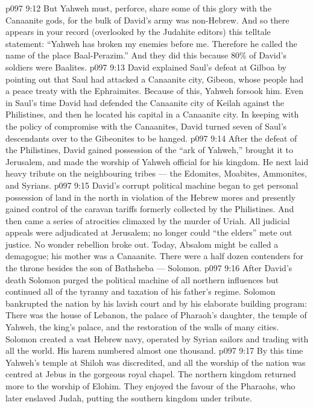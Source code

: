 \vs p097 9:12 But Yahweh must, perforce, share some of this glory with the Canaanite gods, for the bulk of David’s army was non\hyp{}Hebrew. And so there appears in your record (overlooked by the Judahite editors) this telltale statement: “Yahweh has broken my enemies before me. Therefore he called the name of the place Baal\hyp{}Perazim.” And they did this because 80\% of David’s soldiers were Baalites.
\vs p097 9:13 David explained Saul’s defeat at Gilboa by pointing out that Saul had attacked a Canaanite city, Gibeon, whose people had a peace treaty with the Ephraimites. Because of this, Yahweh forsook him. Even in Saul’s time David had defended the Canaanite city of Keilah against the Philistines, and then he located his capital in a Canaanite city. In keeping with the policy of compromise with the Canaanites, David turned seven of Saul’s descendants over to the Gibeonites to be hanged.
\vs p097 9:14 After the defeat of the Philistines, David gained possession of the “ark of Yahweh,” brought it to Jerusalem, and made the worship of Yahweh official for his kingdom. He next laid heavy tribute on the neighbouring tribes --- the Edomites, Moabites, Ammonites, and Syrians.
\vs p097 9:15 David’s corrupt political machine began to get personal possession of land in the north in violation of the Hebrew mores and presently gained control of the caravan tariffs formerly collected by the Philistines. And then came a series of atrocities climaxed by the murder of Uriah. All judicial appeals were adjudicated at Jerusalem; no longer could “the elders” mete out justice. No wonder rebellion broke out. Today, Absalom might be called a demagogue; his mother was a Canaanite. There were a half dozen contenders for the throne besides the son of Bathsheba --- Solomon.
\vs p097 9:16 \pc After David’s death Solomon purged the political machine of all northern influences but continued all of the tyranny and taxation of his father’s regime. Solomon bankrupted the nation by his lavish court and by his elaborate building program: There was the house of Lebanon, the palace of Pharaoh’s daughter, the temple of Yahweh, the king’s palace, and the restoration of the walls of many cities. Solomon created a vast Hebrew navy, operated by Syrian sailors and trading with all the world. His harem numbered almost one thousand.
\vs p097 9:17 \pc By this time Yahweh’s temple at Shiloh was discredited, and all the worship of the nation was centred at Jebus in the gorgeous royal chapel. The northern kingdom returned more to the worship of Elohim. They enjoyed the favour of the Pharaohs, who later enslaved Judah, putting the southern kingdom under tribute.
